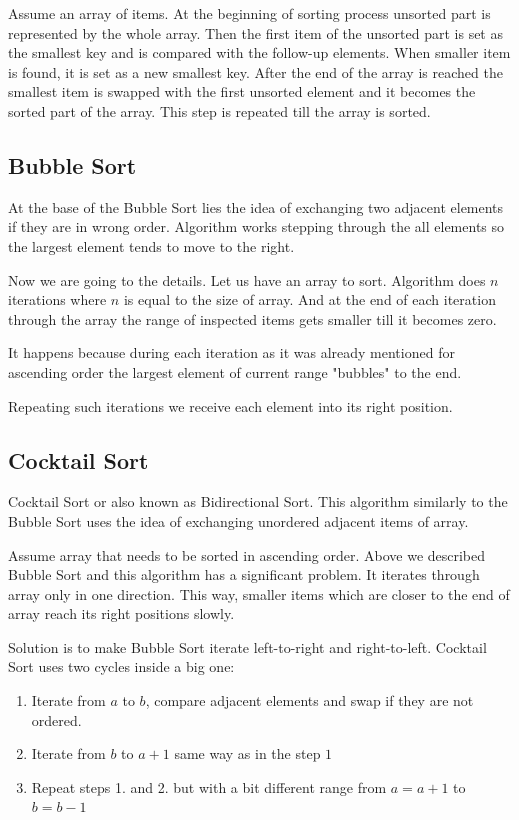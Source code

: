\documentclass[
  field=inf,
  biblatex,
  language=english,
  glossaries,
  index
]{kidiplom}
\begin{document}
Assume an array of items. At the beginning of sorting process unsorted part is represented by the whole array. Then the first item of the unsorted part is set as the smallest key and is compared with the follow-up elements. When smaller item is found, it is set as a new smallest key. After the end of the array is reached the smallest item is swapped with the first unsorted  element and it becomes the sorted part of the array. This step is repeated till the array is sorted.

\subsection{Bubble Sort}

At the base of the Bubble Sort lies the idea of exchanging two adjacent elements if they are in wrong order. Algorithm works stepping through the all elements so the largest element tends to move to the right.

Now we are going to the details. Let us have an array to sort. Algorithm does $n$ iterations where $n$ is equal to the size of array. And at the end of each iteration through the array the range of inspected items gets smaller till it becomes zero.

It happens because during each iteration as it was already mentioned for ascending order the largest element of current range "bubbles" to the end.

Repeating such iterations we receive each element into its right position.

\subsection{Cocktail Sort}

Cocktail Sort or also known as Bidirectional Sort. This algorithm similarly to the Bubble Sort uses the idea of exchanging unordered adjacent items of array. 

Assume array that needs to be sorted in ascending order. Above we described Bubble Sort and this algorithm has a significant problem. It iterates through array only in one direction. This way, smaller items which are closer to the end of array reach its right positions slowly.

Solution is to make Bubble Sort iterate left-to-right and right-to-left. Cocktail Sort uses two cycles inside a big one:

\begin{enumerate}
 \item Iterate from $a$ to $b$, compare adjacent elements and swap if they are not ordered.
 \item Iterate from $b$ to $a + 1$ same way as in the step $1$
 \item Repeat steps 1. and 2. but with a bit different range from $a = a + 1$ to $b = b - 1$
\end{enumerate}
\end{document}
